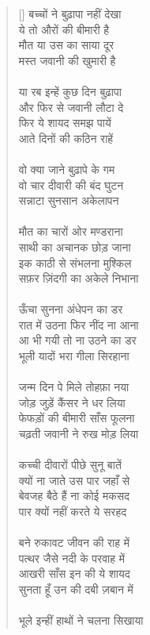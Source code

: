 \begin{verse}[\versewidth]\texthindi{
बच्चों ने बुढ़ापा नहीं देखा\\
ये तो औरों की बीमारी है\\
मौत या उस का साया दूर\\
मस्त जवानी की खुमारी है\\
\\
या रब इन्हें कुछ दिन बुढ़ापा\\
और फिर से जवानी लौटा दे\\
फिर ये शायद समझ पायें\\
आते दिनों की कठिन राहें\\
\\
वो क्या जाने बुढ़ापे के गम\\
वो चार दीवारी की बंद घुटन\\
सन्नाटा सुनसान अकेलापन\\
\\
मौत का चारों ओर मण्डराना\\
साथी का अचानक छोड़ जाना\\
इक काठी से संभलना मुश्किल\\
सफ़र ज़िंदगी का अकेले निभाना\\
\\
ऊँचा सुनना अंधेपन का डर\\
रात में उठना फिर नींद ना आना\\
आ भी गयी तो ना उठने का डर\\
भूली यादों भरा गीला सिरहाना\\
\\
जन्म दिन पे मिले तोहफ़ा नया\\
जोड़ जुड़ें कैंसर ने धर लिया\\
फेफड़ों की बीमारी साँस फूलना\\
चढ़ती जवानी ने रुख मोड़ लिया\\
\\
कच्ची दीवारों पीछे सुनू बातें\\
क्यों ना जाते उस पार जहाँ से\\
बेवजह बैठे हैं ना कोई मकसद\\
पार क्यों नहीं करते ये सरहद\\
\\
बने रुकावट जीवन की राह में\\
पत्थर जैसे नदी के परवाह में\\
आखरी साँस इन की ये शायद\\
सुनता हूँ उन की दबी ज़बान में\\
\\
भूले इन्हीं हाथों ने चलना सिखाया\\
}
\end{verse}
